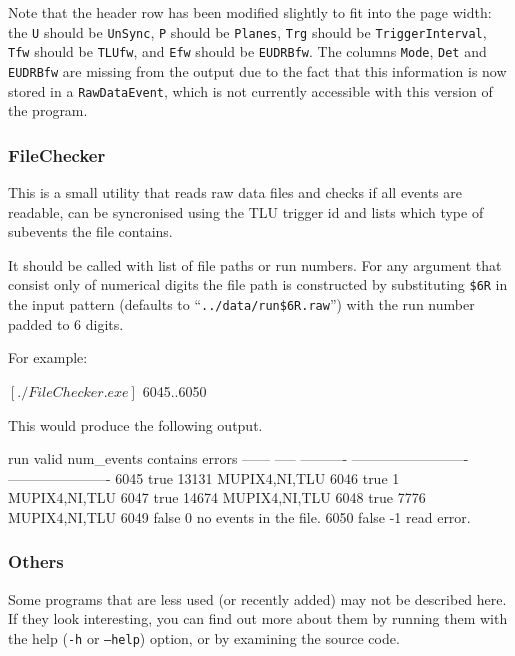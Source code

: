Note that the header row has been modified slightly to fit into the page width:
the \texttt{U} should be \texttt{UnSync}, \texttt{P} should be \texttt{Planes},
\texttt{Trg} should be \texttt{TriggerInterval}, \texttt{Tfw} should be \texttt{TLUfw},
and \texttt{Efw} should be \texttt{EUDRBfw}.
The columns \texttt{Mode}, \texttt{Det} and \texttt{EUDRBfw} are missing from the output
due to the fact that this information is now stored in a \texttt{RawDataEvent},
which is not currently accessible with this version of the program.

\subsubsection{FileChecker}

This is a small utility that reads raw data files and checks if all events are
readable, can be syncronised using the TLU trigger id and lists which type
of subevents the file contains.

It should be called with list of file paths or run numbers. For any argument
that consist only of numerical digits the file path is constructed by
substituting \texttt{\$6R} in the input pattern (defaults to
``\texttt{../data/run\$6R.raw}'') with the run number padded to 6 digits.

For example:
\begin{listing}[mybash]
$[./FileChecker.exe]$ {6045..6050}
\end{listing}

This would produce the following output.
\begin{listing}[]
run     valid  num_events  contains                   errors                    
------  -----  ----------  -------------------------  ----------------------
  6045   true       13131  MUPIX4,NI,TLU                                        
  6046   true           1  MUPIX4,NI,TLU                                        
  6047   true       14674  MUPIX4,NI,TLU                                        
  6048   true        7776  MUPIX4,NI,TLU                                        
  6049  false           0                             no events in the file.    
  6050  false          -1                             read error. 
\end{listing}

\subsubsection{Others}
Some programs that are less used (or recently added)
may not be described here.
If they look interesting, you can find out more about them
by running them with the help (\texttt{-h} or \texttt{--help}) option,
or by examining the source code.
